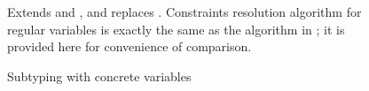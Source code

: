\begin{figure}[t]
\begin{minipage}{6.5cm}
\begin{algorithm}[H]
\end{algorithm}  
\end{minipage}
\hspace{0.2cm}
\begin{minipage}{6.5cm}
\begin{algorithm}[H]

\end{algorithm}  
\end{minipage}
\caption{Subtyping with concrete variables}\label{fig:subty-concrete}
\begin{tablenotes}[para]
\small
    Extends  and ,
    and replaces .
    Constraints resolution algorithm for regular variables is exactly the same
    as the algorithm in ; it is provided here for
    convenience of comparison.
\end{tablenotes}
\end{figure}